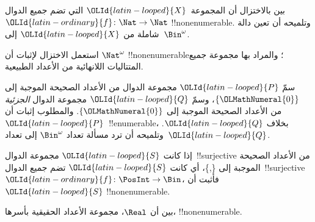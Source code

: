 \documentclass[../../../include/open-logic-section]{subfiles}
\begin{document}
\begin{prob}\label{sfr:siz:red:prob:nat-nat}
بين بالاختزال أن المجموعة~${\OLId{latin-looped}{X}}$ التي تضم جميع الدوال ${\OLId{latin-ordinary}{f}}\colon \Nat \to \Nat$ !!{nonenumerable}. وتلميحه أن تعين دالة شاملة من ${\OLId{latin-looped}{X}}$ إلى~$\Bin^\omega$.
\end{prob}

\begin{prob}
استعمل الاختزال لإثبات أن $\Nat^\omega$ !!{nonenumerable}؛ والمراد بها مجموعة جميع المتتاليات اللانهائية من الأعداد الطبيعية.
\end{prob}

\begin{prob}
سمّ ${\OLId{latin-looped}{P}}$ مجموعة الدوال من الأعداد الصحيحة الموجبة إلى $\{{\OLMathNumeral{0}}\}$، وسمّ ${\OLId{latin-looped}{Q}}$ مجموعة الدوال \emph{الجزئية} من الأعداد الصحيحة الموجبة إلى $\{{\OLMathNumeral{0}}\}$. والمطلوب إثبات أن ${\OLId{latin-looped}{P}}$~!!{enumerable}، بخلاف ${\OLId{latin-looped}{Q}}$. وتلميحه أن ترد مسألة تعداد $\Bin^\omega$ إلى تعداد~${\OLId{latin-looped}{Q}}$.
\end{prob}

\begin{prob}
إذا كانت ${\OLId{latin-looped}{S}}$ مجموعة الدوال~!!{surjective} من الأعداد الصحيحة الموجبة إلى \{,\}، أي كانت ${\OLId{latin-looped}{S}}$ تضم جميع الدوال~!!{surjective}~${\OLId{latin-ordinary}{f}}\colon \PosInt \to \Bin$، فأثبت أن ${\OLId{latin-looped}{S}}$ !!{nonenumerable}.
\end{prob}

\begin{prob}
بين أن $\Real$، مجموعة الأعداد الحقيقية بأسرها، !!{nonenumerable}.
\end{prob}
\end{document}

